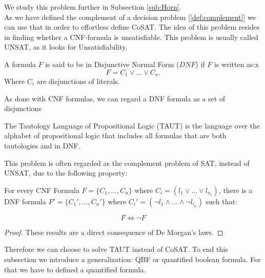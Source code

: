 We study this problem further  in Subsection \ref{sub:Horn}.\\



As we have defined the complement of a decision problem [\ref{def:complement}] we can use that in order to effortless define CoSAT. The idea of this problem resides in finding whether a CNF-formula is unsatisfiable. This problem is usually called UNSAT, as it looks for Unsatisfiability. 

\begin{definition}
  A formula $F$ is said to be in Disjunctive Normal Form ($DNF$) if $F$ is written as:x
  $$F = C_1\lor ... \lor C_n.$$
  Where $C_i$  are disjunctions of literals.
\end{definition}

As done with CNF formulas, we can regard a DNF formula as a set of disjunctions

\begin{definition}[TAUT] The Tautology Language of Propositional Logic (TAUT) is the language over the alphabet of propositional logic that includes all formulas that are both tautologies and in DNF. 
\end{definition}

This problem is often regarded as the complement problem of SAT, instead of UNSAT, due to the following property:

\begin{proposition}
  For every CNF Formula $F=\{C_1,...,C_n\}$ where $C_i = (l_{1}\lor ... \lor l_{n_i})$, there is a DNF formula $F' = \{C_1',...,C_n'\}$ where $C_i' = (\neg l_1 \land ...\land \neg l_{i_n})$ such that:

  $$F \iff \neg F$$
\end{proposition}
\begin{proof}
These results are a direct consequence of De Morgan's laws.
\end{proof}


Therefore we can choose to solve TAUT instead of CoSAT. To end this subsection we introduce a generalization: QBF or quantified boolean formula. For that we have to defined a quantified formula.


